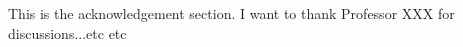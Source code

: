 \begin{acknowledgements}
  This is the acknowledgement section. I want to thank Professor XXX for discussions...etc etc
  
\end{acknowledgements}
